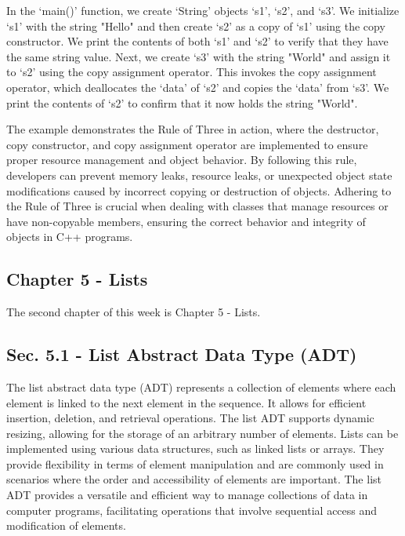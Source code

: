\begin{solution}
    In the `main()' function, we create `String' objects `s1', `s2', and `s3'. We initialize `s1' with the string "Hello" and then create `s2' as a copy of `s1' using the copy constructor. We print the contents of both `s1' and `s2' to verify that they have the same string value. Next, we 
    create `s3' with the string "World" and assign it to `s2' using the copy assignment operator. This invokes the copy assignment operator, which deallocates the `data' of `s2' and copies the `data' from `s3'. We print the contents of `s2' to confirm that it now holds the string "World".
    
    The example demonstrates the Rule of Three in action, where the destructor, copy constructor, and copy assignment operator are implemented to ensure proper resource management and object behavior. By following this rule, developers can prevent memory leaks, resource leaks, or unexpected 
    object state modifications caused by incorrect copying or destruction of objects. Adhering to the Rule of Three is crucial when dealing with classes that manage resources or have non-copyable members, ensuring the correct behavior and integrity of objects in C++ programs.
\end{solution}

\subsection{Chapter 5 - Lists}

The second chapter of this week is Chapter 5 - Lists.

\subsection*{Sec. 5.1 - List Abstract Data Type (ADT)}

The list abstract data type (ADT) represents a collection of elements where each element is linked to the next element in the sequence. It allows for efficient insertion, deletion, and retrieval operations. The list ADT supports dynamic resizing, allowing for the storage of an arbitrary number 
of elements. Lists can be implemented using various data structures, such as linked lists or arrays. They provide flexibility in terms of element manipulation and are commonly used in scenarios where the order and accessibility of elements are important. The list ADT provides a versatile and efficient 
way to manage collections of data in computer programs, facilitating operations that involve sequential access and modification of elements.

